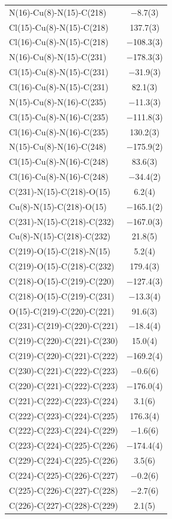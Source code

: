 \begin{center}
{\begin{supertabular}{p{1.8in}c}
N(16)-Cu(8)-N(15)-C(218)&$-$8.7(3)\\
Cl(15)-Cu(8)-N(15)-C(218)&137.7(3)\\
Cl(16)-Cu(8)-N(15)-C(218)&$-$108.3(3)\\
N(16)-Cu(8)-N(15)-C(231)&$-$178.3(3)\\
Cl(15)-Cu(8)-N(15)-C(231)&$-$31.9(3)\\
Cl(16)-Cu(8)-N(15)-C(231)&82.1(3)\\
N(15)-Cu(8)-N(16)-C(235)&$-$11.3(3)\\
Cl(15)-Cu(8)-N(16)-C(235)&$-$111.8(3)\\
Cl(16)-Cu(8)-N(16)-C(235)&130.2(3)\\
N(15)-Cu(8)-N(16)-C(248)&$-$175.9(2)\\
Cl(15)-Cu(8)-N(16)-C(248)&83.6(3)\\
Cl(16)-Cu(8)-N(16)-C(248)&$-$34.4(2)\\
C(231)-N(15)-C(218)-O(15)&6.2(4)\\
Cu(8)-N(15)-C(218)-O(15)&$-$165.1(2)\\
C(231)-N(15)-C(218)-C(232)&$-$167.0(3)\\
Cu(8)-N(15)-C(218)-C(232)&21.8(5)\\
C(219)-O(15)-C(218)-N(15)&5.2(4)\\
C(219)-O(15)-C(218)-C(232)&179.4(3)\\
C(218)-O(15)-C(219)-C(220)&$-$127.4(3)\\
C(218)-O(15)-C(219)-C(231)&$-$13.3(4)\\
O(15)-C(219)-C(220)-C(221)&91.6(3)\\
C(231)-C(219)-C(220)-C(221)&$-$18.4(4)\\
C(219)-C(220)-C(221)-C(230)&15.0(4)\\
C(219)-C(220)-C(221)-C(222)&$-$169.2(4)\\
C(230)-C(221)-C(222)-C(223)&$-$0.6(6)\\
C(220)-C(221)-C(222)-C(223)&$-$176.0(4)\\
C(221)-C(222)-C(223)-C(224)&3.1(6)\\
C(222)-C(223)-C(224)-C(225)&176.3(4)\\
C(222)-C(223)-C(224)-C(229)&$-$1.6(6)\\
C(223)-C(224)-C(225)-C(226)&$-$174.4(4)\\
C(229)-C(224)-C(225)-C(226)&3.5(6)\\
C(224)-C(225)-C(226)-C(227)&$-$0.2(6)\\
C(225)-C(226)-C(227)-C(228)&$-$2.7(6)\\
C(226)-C(227)-C(228)-C(229)&2.1(5)\\

\end{supertabular}}
\end{center}
